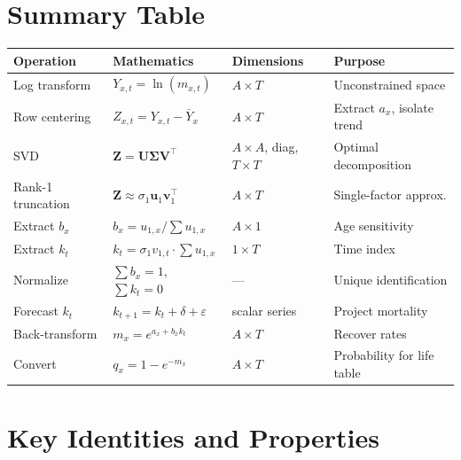 \documentclass[11pt,a4paper]{article}
\begin{document}
\section{Summary Table}

\begin{center}
\small
\renewcommand{\arraystretch}{1.3}
\begin{tabular}{@{} p{3.2cm} p{4.5cm} p{2.5cm} p{3.5cm} @{}}
\toprule
\textbf{Operation} & \textbf{Mathematics} & \textbf{Dimensions} & \textbf{Purpose} \\
\midrule
Log transform & $Y_{x,t} = \ln(m_{x,t})$ & $A \times T$ & Unconstrained space \\
Row centering & $Z_{x,t} = Y_{x,t} - \bar{Y}_x$ & $A \times T$ & Extract $a_x$, isolate trend \\
SVD & $\bm{Z} = \bm{U}\bm{\Sigma}\bm{V}^\top$ & $A\!\times\!A$, diag, $T\!\times\!T$ & Optimal decomposition \\
Rank-1 truncation & $\bm{Z} \approx \sigma_1 \bm{u}_1 \bm{v}_1^\top$ & $A \times T$ & Single-factor approx. \\
Extract $b_x$ & $b_x = u_{1,x} / \sum u_{1,x}$ & $A \times 1$ & Age sensitivity \\
Extract $k_t$ & $k_t = \sigma_1 v_{1,t} \cdot \sum u_{1,x}$ & $1 \times T$ & Time index \\
Normalize & $\sum b_x = 1$, $\sum k_t = 0$ & --- & Unique identification \\
Forecast $k_t$ & $k_{t+1} = k_t + \delta + \varepsilon$ & scalar series & Project mortality \\
Back-transform & $m_x = e^{a_x + b_x k_t}$ & $A \times T$ & Recover rates \\
Convert & $q_x = 1 - e^{-m_x}$ & $A \times T$ & Probability for life table \\
\bottomrule
\end{tabular}
\end{center}

\section{Key Identities and Properties}
\end{document}
